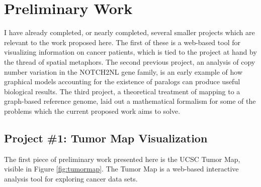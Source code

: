 \documentclass[11pt,proposal]{ucthesis}
\begin{document}
    
    
    
    
    

\chapter{Preliminary Work}

I have already completed, or nearly completed, several smaller projects which are relevant to the work proposed here. The first of these is a web-based tool for visualizing information on cancer patients, which is tied to the project at hand by the thread of spatial metaphors. The second previous project, an analysis of copy number variation in the NOTCH2NL gene family, is an early example of how graphical models accounting for the existence of paralogs can produce useful biological results. The third project, a theoretical treatment of mapping to a graph-based reference genome, laid out a mathematical formalism for some of the problems which the current proposed work aims to solve.


\section{Project \#1: Tumor Map Visualization}

The first piece of preliminary work presented here is the UCSC Tumor Map, visible in Figure \ref{fig:tumormap}. The Tumor Map is a web-based interactive analysis tool for exploring cancer data sets. 
\end{document}
